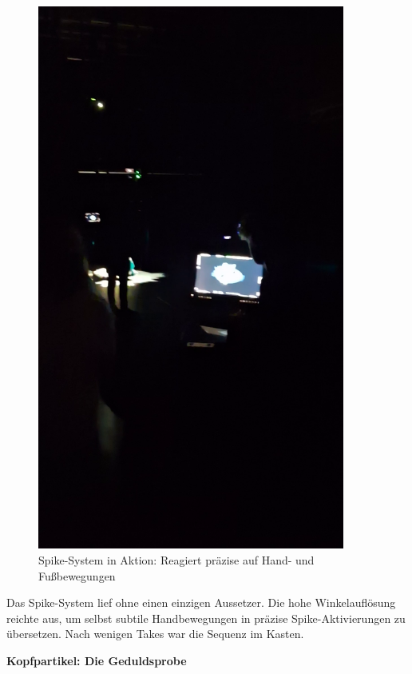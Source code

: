 \begin{figure}[h]
   \centering
   \includegraphics[width=0.9\textwidth]{images/BTS_ProducerScreen.png}
   \caption{Spike-System in Aktion: Reagiert präzise auf Hand- und Fußbewegungen}
   \label{fig:spike_action}
\end{figure}

Das Spike-System lief ohne einen einzigen Aussetzer. Die hohe Winkelauflösung reichte aus, um selbst subtile Handbewegungen in präzise Spike-Aktivierungen zu übersetzen. Nach wenigen Takes war die Sequenz im Kasten.

\newpage

\textbf{Kopfpartikel: Die Geduldsprobe}

